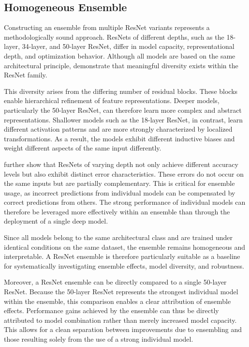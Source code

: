 \subsection{Homogeneous Ensemble}
\label{meth:homo}

Constructing an ensemble from multiple ResNet variants represents a methodologically sound approach. 
ResNets of different depths, such as the 18-layer, 34-layer, and 50-layer ResNet, differ in model capacity, representational depth, and optimization behavior. 
Although all models are based on the same architectural principle, \citet{He_2016_CVPR} demonstrate that meaningful diversity exists within the ResNet family.

This diversity arises from the differing number of residual blocks. 
These blocks enable hierarchical refinement of feature representations. 
Deeper models, particularly the 50-layer ResNet, can therefore learn more complex and abstract representations. 
Shallower models such as the 18-layer ResNet, in contrast, learn different activation patterns and are more strongly characterized by localized transformations. 
As a result, the models exhibit different inductive biases and weight different aspects of the same input differently.

\citet{He_2016_CVPR} further show that ResNets of varying depth not only achieve different accuracy levels but also exhibit distinct error characteristics. 
These errors do not occur on the same inputs but are partially complementary. 
This is critical for ensemble usage, as incorrect predictions from individual models can be compensated by correct predictions from others. 
The strong performance of individual models can therefore be leveraged more effectively within an ensemble than through the deployment of a single deep model.

Since all models belong to the same architectural class and are trained under identical conditions on the same dataset, the ensemble remains homogeneous and interpretable. 
A ResNet ensemble is therefore particularly suitable as a baseline for systematically investigating ensemble effects, model diversity, and robustness.

Moreover, a ResNet ensemble can be directly compared to a single 50-layer ResNet. 
Because the 50-layer ResNet represents the strongest individual model within the ensemble, this comparison enables a clear attribution of ensemble effects. 
Performance gains achieved by the ensemble can thus be directly attributed to model combination rather than merely increased model capacity. 
This allows for a clean separation between improvements due to ensembling and those resulting solely from the use of a strong individual model.

